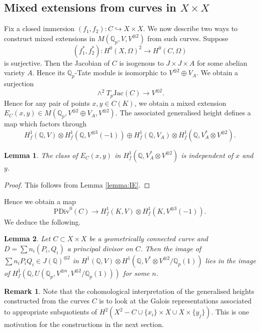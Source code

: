 \documentclass[11pt]{amsart}
\def\Q{\mathbb Q}
\newcommand{\PDiv}{\mathrm{PDiv}}
\theoremstyle{plain}
\newtheorem{lemma}{Lemma}
\theoremstyle{definition}
\newtheorem{remark}{Remark}
\newcommand{\Jac}{\mathrm{Jac}}
\begin{document}
\subsection{Mixed extensions from curves in $X\times X$}\label{subsec:curve}
Fix a closed immersion $(f_1 ,f_2 ):C\hookrightarrow X\times X$. We now describe two ways to construct mixed extensions in $M(\Q _p ,V,V^{\otimes 2})$ from such curves. Suppose
\[
(f_1 ^* ,f_2 ^* ):H^0 (X,\Omega )^2 \to H^0 (C,\Omega )
\]
is surjective. Then the Jacobian of $C$ is isogenous to $J\times J\times A$ for some abelian variety $A$. Hence its $\Q _p $-Tate module is isomorphic to $V^{\oplus 2}\oplus V_A$. We obtain a surjection
\[
\wedge ^2 T_p \Jac (C)\to V^{\otimes 2}.
\]
Hence for any pair of points $x,y\in C(K)$, we obtain a mixed extension $E_C (x,y) \in M(\Q _p ,V^{\oplus 2}\oplus V_A ,V^{\otimes 2})$. The associated generalised height defines a map which factors through
\[
H^1 _f (\Q ,V)\otimes H^1 _f (\Q ,V^{\otimes 3}(-1))\oplus H^1 _f (\Q ,V_A )\otimes H^1 _f (\Q ,V_A ^* \otimes V^{\otimes 2}).
\]
\begin{lemma}
The class of $E_C (x,y)$ in $H^1 _f (\Q ,V_A ^* \otimes V^{\otimes 2})$ is independent of $x$ and $y$.
\end{lemma}
\begin{proof}
This follows from Lemma \ref{lemma:IE}.
\end{proof}
Hence we obtain a map
\[
\PDiv ^0 (C)\to H^1 _f (K,V)\otimes H^1 _f (K,V^{\otimes 3}(-1)).
\]
We deduce the following.
\begin{lemma}\label{lemma:find_div}
Let $C\subset X\times X$ be a geometrically connected curve and $D=\sum n_i (P_i ,Q_i )$ a principal divisor on $C$. Then the image of $\sum n _i P_i Q_i \in J(\Q )^{\otimes 2}$ in $H^1 (\Q ,V)\otimes H^1 (\Q ,V^* \otimes V^{\otimes 2}/\Q _p (1))$ lies in the image of $H^1 _f (\Q ,U(\Q _p ,V^{\oplus n},V^{\otimes 2}/\Q _p (1)))$ for some $n$.  
\end{lemma}
\begin{remark}
Note that the cohomological interpretation of the generalised heights constructed from the curves $C$ is to look at the Galois representations associated to appropriate subquotients of $H^2 (X^2 -C \cup \{x_i \} \times X \cup X\times \{y _j \})$. This is one motivation for the constructions in the next section.
\end{remark}
\end{document}
